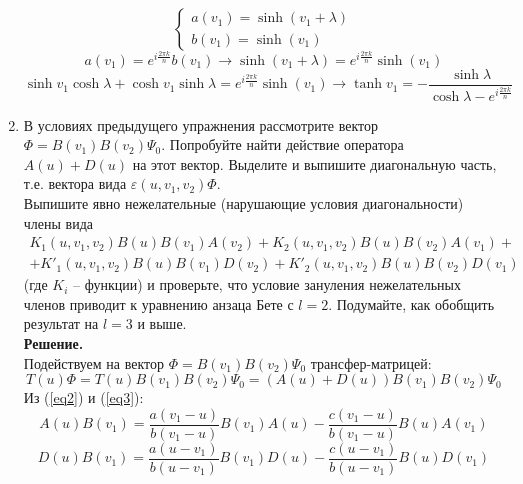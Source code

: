 \documentclass[12pt]{article}
\theoremstyle{definition}
\begin{document}
\begin{enumerate}
\begin{equation}
\begin{cases}
            a(v_1)=\sinh(v_1+\lambda)\\
            b(v_1)=\sinh(v_1)
        \end{cases}
    \end{equation}
    \begin{equation}
        a(v_1)=e^{i\frac{2\pi k}{n}}b(v_1)\rightarrow\sinh(v_1+\lambda)=e^{i\frac{2\pi k}{n}}\sinh(v_1)
    \end{equation}
    \begin{equation}
        \sinh v_1\cosh\lambda+\cosh v_1\sinh\lambda=e^{i\frac{2\pi k}{n}}\sinh(v_1)\rightarrow\tanh v_1=-\frac{\sinh\lambda}{\cosh\lambda-e^{i\frac{2\pi k}{n}}}
    \end{equation}
    \item В условиях предыдущего упражнения рассмотрите вектор $\Phi=B(v_1)B(v_2)\Psi_0$. Попробуйте найти действие оператора $A(u)+D(u)$ на этот вектор. Выделите и выпишите диагональную часть, т.е. вектора вида $\varepsilon(u,v_1,v_2)\Phi$.\\
    Выпишите явно нежелательные (нарушающие условия диагональности) члены вида
    \begin{multline}
        K_1(u,v_1,v_2)B(u)B(v_1)A(v_2)+K_2(u,v_1,v_2)B(u)B(v_2)A(v_1)+\\+K'_1(u,v_1,v_2)B(u)B(v_1)D(v_2)+K'_2(u,v_1,v_2)B(u)B(v_2)D(v_1)
    \end{multline}
    (где $K_i$ -- функции) и проверьте, что условие зануления нежелательных членов приводит к уравнению анзаца Бете с $l=2$. Подумайте, как обобщить результат на $l=3$ и выше.\\
    \textbf{Решение.}\\
    Подействуем на вектор $\Phi=B(v_1)B(v_2)\Psi_0$ трансфер-матрицей:
    \begin{equation}
        T(u)\Phi=T(u)B(v_1)B(v_2)\Psi_0=(A(u)+D(u))B(v_1)B(v_2)\Psi_0
    \end{equation}
    Из (\ref{eq2}) и (\ref{eq3}):
    \begin{equation}
        A(u)B(v_1)=\frac{a(v_1-u)}{b(v_1-u)}B(v_1)A(u)-\frac{c(v_1-u)}{b(v_1-u)}B(u)A(v_1)
    \end{equation}
    \begin{equation}
        D(u)B(v_1)=\frac{a(u-v_1)}{b(u-v_1)}B(v_1)D(u)-\frac{c(u-v_1)}{b(u-v_1)}B(u)D(v_1)
    \end{equation}
    \begin{multline}

\end{multline}
\end{enumerate}
\end{document}
